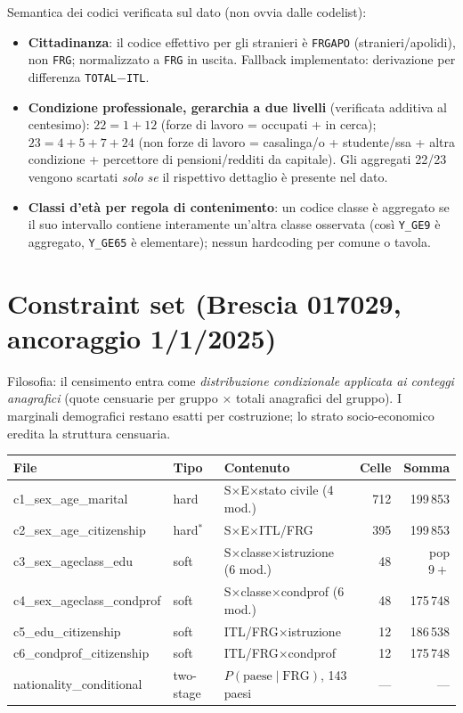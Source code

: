 \documentclass[11pt,a4paper]{article}
\newcommand{\code}[1]{\texttt{#1}}
\begin{document}
\noindent Semantica dei codici verificata sul dato (non ovvia dalle codelist):
\begin{itemize}[leftmargin=*]
  \item \textbf{Cittadinanza}: il codice effettivo per gli stranieri \`e
  \code{FRGAPO} (stranieri/apolidi), non \code{FRG}; normalizzato a \code{FRG} in
  uscita. Fallback implementato: derivazione per differenza
  \code{TOTAL}$-$\code{ITL}.
  \item \textbf{Condizione professionale, gerarchia a due livelli} (verificata
  additiva al centesimo): $22 = 1 + 12$ (forze di lavoro = occupati + in cerca);
  $23 = 4+5+7+24$ (non forze di lavoro = casalinga/o + studente/ssa + altra
  condizione + percettore di pensioni/redditi da capitale). Gli aggregati 22/23
  vengono scartati \emph{solo se} il rispettivo dettaglio \`e presente nel dato.
  \item \textbf{Classi d'et\`a per regola di contenimento}: un codice classe \`e
  aggregato se il suo intervallo contiene interamente un'altra classe osservata
  (cos\`i \code{Y\_GE9} \`e aggregato, \code{Y\_GE65} \`e elementare); nessun
  hardcoding per comune o tavola.
\end{itemize}

\section{Constraint set (Brescia 017029, ancoraggio 1/1/2025)}
\label{sec:constraints}
Filosofia: il censimento entra come \emph{distribuzione condizionale applicata ai
conteggi anagrafici} (quote censuarie per gruppo $\times$ totali anagrafici del
gruppo). I marginali demografici restano esatti per costruzione; lo strato
socio-economico eredita la struttura censuaria.

\begin{center}
\small
\begin{tabular}{@{}llp{4.6cm}rr@{}}
\toprule
\textbf{File} & \textbf{Tipo} & \textbf{Contenuto} & \textbf{Celle} & \textbf{Somma}\\
\midrule
c1\_sex\_age\_marital & hard & S$\times$E$\times$stato civile (4 mod.) & 712 & 199\,853\\
c2\_sex\_age\_citizenship & hard$^{*}$ & S$\times$E$\times$ITL/FRG & 395 & 199\,853\\
c3\_sex\_ageclass\_edu & soft & S$\times$classe$\times$istruzione (6 mod.) & 48 & pop $9+$\\
c4\_sex\_ageclass\_condprof & soft & S$\times$classe$\times$condprof (6 mod.) & 48 & 175\,748\\
c5\_edu\_citizenship & soft & ITL/FRG$\times$istruzione & 12 & 186\,538\\
c6\_condprof\_citizenship & soft & ITL/FRG$\times$condprof & 12 & 175\,748\\
nationality\_conditional & two-stage & $P(\text{paese}\mid\text{FRG})$, 143 paesi & --- & ---\\
\bottomrule
\end{tabular}
\end{center}
\end{document}
